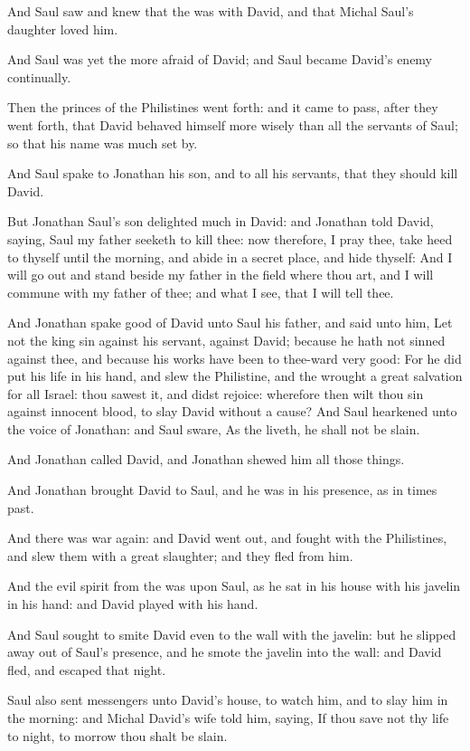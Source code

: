 \Verse And Saul saw and knew that the \LORD was with David, and that Michal Saul's daughter loved him.

\Verse And Saul was yet the more afraid of David; and Saul became David's enemy continually.

\Verse Then the princes of the Philistines went forth: and it came to pass, after they went forth, that David behaved himself more wisely than all the servants of Saul; so that his name was much set by.


\Chapter
\Verse And Saul spake to Jonathan his son, and to all his servants, that they should kill David.

\Verse But Jonathan Saul's son delighted much in David: and Jonathan told David, saying, Saul my father seeketh to kill thee: now therefore, I pray thee, take heed to thyself until the morning, and abide in a secret place, and hide thyself: \Verse And I will go out and stand beside my father in the field where thou art, and I will commune with my father of thee; and what I see, that I will tell thee.

\Verse And Jonathan spake good of David unto Saul his father, and said unto him, Let not the king sin against his servant, against David; because he hath not sinned against thee, and because his works have been to thee-ward very good: \Verse For he did put his life in his hand, and slew the Philistine, and the \LORD wrought a great salvation for all Israel: thou sawest it, and didst rejoice: wherefore then wilt thou sin against innocent blood, to slay David without a cause?  \Verse And Saul hearkened unto the voice of Jonathan: and Saul sware, As the \LORD liveth, he shall not be slain.

\Verse And Jonathan called David, and Jonathan shewed him all those things.

And Jonathan brought David to Saul, and he was in his presence, as in times past.

\Verse And there was war again: and David went out, and fought with the Philistines, and slew them with a great slaughter; and they fled from him.

\Verse And the evil spirit from the \LORD was upon Saul, as he sat in his house with his javelin in his hand: and David played with his hand.

\Verse And Saul sought to smite David even to the wall with the javelin: but he slipped away out of Saul's presence, and he smote the javelin into the wall: and David fled, and escaped that night.

\Verse Saul also sent messengers unto David's house, to watch him, and to slay him in the morning: and Michal David's wife told him, saying, If thou save not thy life to night, to morrow thou shalt be slain.


